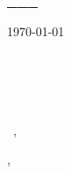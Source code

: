 \documentclass[12pt]{letter}
\begin{document}
\selectfont
\AddToShipoutPictureBG{%
\color{gr}
\AtPageUpperLeft{\rule[-1.6in]{\paperwidth}{1.6in}}
}

\begin{center}
{\Huge \scshape \myname}\par
{\mytitle}

\href{mailto:\myemail}{\faEnvelope~ \myemail}\hfill
\href{https://www.\mywebsite}{\faGlobe~ \mywebsite}\hfill
\href{tel:\phone}{\faPhone~ \phone}\hfill
\faMapMarker~ \mylocation
\end{center}

\vspace{0.2in}
\onehalfspacing
\fontsize{13}{15}\selectfont
\today\hfill

\vspace{0.1in}
\recipient\\%
\fullcompany\\
\city \state\\
\\
\vspace{-0.1in}\greeting~\recipientfirstname,\\


\vspace{-0.1in}\setlength\parindent{24pt}




\vspace{0.5in}
\begin{flushright}

\closer,\\
\vspace{0.1in}
\myname\\

\end{flushright}
\end{document}
